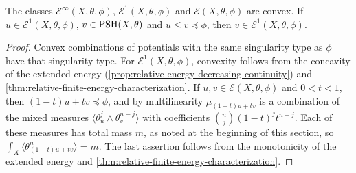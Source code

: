 \begin{corollary}\label{cor:relative-energy-classes-convex}
The classes $\mathcal E^\infty(X,\theta,\phi)$, $\mathcal E^1(X,\theta,\phi)$ and $\mathcal E(X,\theta,\phi)$ are convex. If $u\in\mathcal E^1(X,\theta,\phi)$, $v\in\mathrm{PSH}(X,\theta)$ and $u\leq v\preceq\phi$, then $v\in\mathcal E^1(X,\theta,\phi)$.
\end{corollary}
\begin{proof}
Convex combinations of potentials with the same singularity type as $\phi$ have that singularity type. For $\mathcal E^1(X,\theta,\phi)$, convexity follows from the concavity of the extended energy (\cref{prop:relative-energy-decreasing-continuity}) and \cref{thm:relative-finite-energy-characterization}. If $u,v\in\mathcal E(X,\theta,\phi)$ and $0<t<1$, then $(1-t)u+tv\preceq\phi$, and by multilinearity $\mu_{(1-t)u+tv}$ is a combination of the mixed measures $\langle\theta_u^j\wedge\theta_v^{n-j}\rangle$ with coefficients $\binom nj(1-t)^jt^{n-j}$. Each of these measures has total mass $m$, as noted at the beginning of this section, so $\int_X\langle\theta_{(1-t)u+tv}^n\rangle=m$. The last assertion follows from the monotonicity of the extended energy and \cref{thm:relative-finite-energy-characterization}.
\end{proof}

